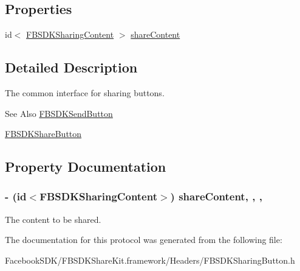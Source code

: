 \subsection*{Properties}
\begin{DoxyCompactItemize}
\item 
id$<$ \hyperlink{protocol_f_b_s_d_k_sharing_content-p}{F\-B\-S\-D\-K\-Sharing\-Content} $>$ \hyperlink{protocol_f_b_s_d_k_sharing_button-p_a065e0c554fc3c324e3c065ed46c1c6cb}{share\-Content}
\end{DoxyCompactItemize}


\subsection{Detailed Description}
The common interface for sharing buttons. \begin{DoxySeeAlso}{See Also}
\hyperlink{interface_f_b_s_d_k_send_button}{F\-B\-S\-D\-K\-Send\-Button} 

\hyperlink{interface_f_b_s_d_k_share_button}{F\-B\-S\-D\-K\-Share\-Button} 
\end{DoxySeeAlso}


\subsection{Property Documentation}
\hypertarget{protocol_f_b_s_d_k_sharing_button-p_a065e0c554fc3c324e3c065ed46c1c6cb}{
\subsubsection[{share\-Content}]{\setlength{\rightskip}{0pt plus 5cm}-\/ (id$<${\bf F\-B\-S\-D\-K\-Sharing\-Content}$>$) share\-Content\hspace{0.3cm}{\ttfamily [read]}, {\ttfamily [write]}, {\ttfamily [nonatomic]}, {\ttfamily [copy]}}}\label{protocol_f_b_s_d_k_sharing_button-p_a065e0c554fc3c324e3c065ed46c1c6cb}
The content to be shared. 

The documentation for this protocol was generated from the following file\-:\begin{DoxyCompactItemize}
\item 
Facebook\-S\-D\-K/\-F\-B\-S\-D\-K\-Share\-Kit.\-framework/\-Headers/F\-B\-S\-D\-K\-Sharing\-Button.\-h\end{DoxyCompactItemize}
